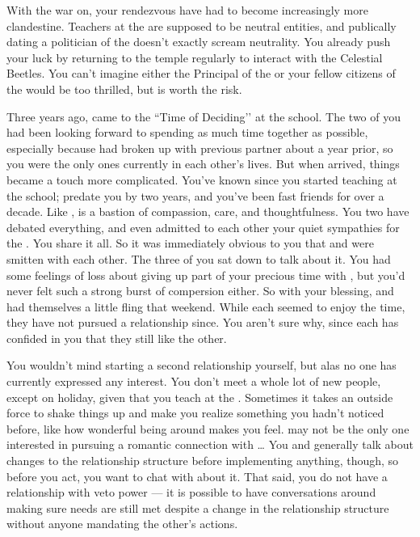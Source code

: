 \documentclass[char]{GL2020}
\begin{document}
With the war on, your rendezvous have had to become increasingly more clandestine. Teachers at the \pSchool{} are supposed to be neutral entities, and publically dating a politician of the \pShip{} doesn’t exactly scream neutrality. You already push your luck by returning to the temple regularly to interact with the Celestial Beetles. You can’t imagine either the Principal of the \pSc{} or your fellow citizens of the \pTech{} would be too thrilled, but \cJuniorStatesman{} is worth the risk. 

Three years ago, \cJuniorStatesman{} came to the ``Time of Deciding’’ at the school. The two of you had been looking forward to spending as much time together as possible, especially because \cJuniorStatesman{} had broken up with \cJuniorStatesman{\their} previous partner about a year prior, so you were the only ones currently in each other’s lives. But when \cJuniorStatesman{\they} arrived, things became a touch more complicated. You’ve known \cEthics{\intro} since you started teaching at the school; \cEthics{\they} predate\cEthics{\verbs} you by two years, and you’ve been fast friends for over a decade. Like \cMusic{}, \cEthics{} is a bastion of compassion, care, and thoughtfulness. You two have debated everything, and even admitted to each other your quiet sympathies for the \pShippies{}. You share it all. So it was immediately obvious to you that \cJuniorStatesman{} and \cEthics{} were smitten with each other. The three of you sat down to talk about it. You had some feelings of loss about giving up part of your precious time with \cJuniorStatesman{}, but you’d never felt such a strong burst of compersion either. So with your blessing, \cJuniorStatesman{} and \cBeetle{} had themselves a little fling that weekend. While each seemed to enjoy the time, they have not pursued a relationship since. You aren’t sure why, since each has confided in you that they still like the other.

You wouldn't mind starting a second relationship yourself, but alas no one has currently expressed any interest. You don't meet a whole lot of new people, except on holiday, given that you teach at the \pSc{}. Sometimes it takes an outside force to shake things up and make you realize something you hadn’t noticed before, like how wonderful being around \cEthics{} makes you feel. \cJuniorStatesman{} may not be the only one interested in pursuing a romantic connection with \cEthics{}\ldots{} You and \cJuniorStatesman{} generally talk about changes to the relationship structure before implementing anything, though, so before you act, you want to chat with \cJuniorStatesman{} about it. That said, you do not have a relationship with veto power — it is possible to have conversations around making sure needs are still met despite a change in the relationship structure without anyone mandating the other's actions.
\end{document}
